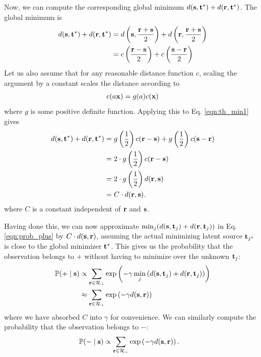 Now, we can compute the corresponding global minimum $d(\mathbf s,\mathbf t^*) + d(\mathbf
r,\mathbf t^*)$. The global minimum is
\begin{align}
d(\mathbf s,\mathbf t^*) + d(\mathbf r,\mathbf t^*) &= d\left(\mathbf s,\frac{\mathbf r + \mathbf s}{2}\right) + d\left(\mathbf r,\frac{\mathbf r + \mathbf s}{2}\right)\notag\\
&= c\left(\frac{\mathbf r - \mathbf s}{2}\right) + c\left(\frac{\mathbf s - \mathbf r}{2}\right) \label{eqn:th_min1}
\end{align}
Let us also assume that for any reasonable distance function $c$, scaling the
argument by a constant scales the distance according to
\begin{gather}
c(a\mathbf x) = g(a)c(\mathbf x)
\end{gather}
where $g$ is some positive definite function. Applying this to Eq. \ref{eqn:th_min1} gives
\begin{align}
d(\mathbf s,\mathbf t^*) + d(\mathbf r,\mathbf t^*) &= g\left(\frac{1}{2}\right) c(\mathbf r - \mathbf s) +  g\left(\frac{1}{2}\right) c(\mathbf s - \mathbf r)\notag\\
&= 2 \cdot g\left(\frac{1}{2}\right) c(\mathbf r - \mathbf s)\notag\\
&= 2 \cdot g\left(\frac{1}{2}\right) d(\mathbf r, \mathbf s)\notag\\
&= C \cdot d(\mathbf r, \mathbf s).
\end{align}
where $C$ is a constant independent of $\mathbf r$ and $\mathbf s$.

Having done this, we can now approximate $\min_j (d(\mathbf s,\mathbf t_j) + d(\mathbf r,\mathbf
t_j))$ in Eq. \ref{eqn:prob_plus} by $C \cdot d(\mathbf s,\mathbf r)$, assuming the
actual minimizing latent source $\mathbf t_{j^*}$ is close to the global minimizer
$\mathbf t^*$. This gives us the probability that the observation belongs to $+$ without
having to minimize over the unknown $\mathbf t_j$:
\begin{align}
\mathbb{P}(+ \;|\;\mathbf s) &\propto \sum_{\mathbf r \in \mathcal{R}_+}
\exp{\left(-\gamma \min_{j} \left( d(\mathbf s,\mathbf t_j) + d(\mathbf r,\mathbf t_j) \right) \right)}\notag\\
&\approx \sum_{\mathbf r \in \mathcal{R}_+} \exp
\left(-\gamma d(\mathbf s,\mathbf r)\right) \label{eqn:prob_plus_approx}
\end{align}
where we have absorbed $C$ into $\gamma$ for convenience. We can similarly compute the probability that the observation belongs to $-$:
\begin{align}
\mathbb{P}(- \;|\; \mathbf s ) &\propto \sum_{\mathbf r \in
  \mathcal{R}_-} \exp \left(-\gamma d(\mathbf s,\mathbf
  r)\right). \label{eqn:prob_minus_approx}
\end{align}


